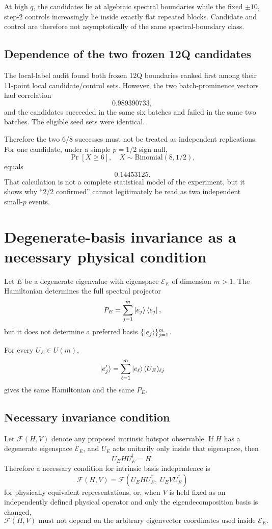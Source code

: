 \documentclass[11pt,a4paper]{article}
\begin{document}
At high \(q\), the candidates lie at algebraic spectral boundaries while the
fixed \(\pm10\), step-2 controls increasingly lie inside exactly flat repeated
blocks.  Candidate and control are therefore not asymptotically of the same
spectral-boundary class.

\subsection{Dependence of the two frozen 12Q candidates}

The local-label audit found both frozen 12Q boundaries ranked first among their
11-point local candidate/control sets.  However, the two batch-prominence
vectors had correlation
\[
0.989390733,
\]
and the candidates succeeded in the same six batches and failed in the same
two batches.  The eligible seed sets were identical.

Therefore the two \(6/8\) successes must not be treated as independent
replications.  For one candidate, under a simple \(p=1/2\) sign null,
\[
\Pr[X\ge6],\quad X\sim\mathrm{Binomial}(8,1/2),
\]
equals
\[
0.14453125.
\]
That calculation is not a complete statistical model of the experiment, but
it shows why ``2/2 confirmed'' cannot legitimately be read as two independent
small-\(p\) events.

\section{Degenerate-basis invariance as a necessary physical condition}

Let \(E\) be a degenerate eigenvalue with eigenspace
\(\mathcal E_E\) of dimension \(m>1\).  The Hamiltonian determines the full
spectral projector
\[
P_E
=
\sum_{j=1}^{m}\ket{e_j}\bra{e_j},
\]
but it does not determine a preferred basis
\(\{\ket{e_j}\}_{j=1}^m\).

For every \(U_E\in U(m)\),
\[
\ket{e_j'}
=
\sum_{\ell=1}^m
\ket{e_\ell}(U_E)_{\ell j}
\]
gives the same Hamiltonian and the same \(P_E\).


\subsection{Necessary invariance condition}

Let \(\mathcal F(H,V)\) denote any proposed intrinsic hotspot observable.
If \(H\) has a degenerate eigenspace \(\mathcal E_E\), and \(U_E\) acts
unitarily only inside that eigenspace, then
\[
U_EHU_E^\dagger=H.
\]
Therefore a necessary condition for intrinsic basis independence is
\[
\boxed{
\mathcal F(H,V)
=
\mathcal F(U_EHU_E^\dagger,\;U_EV U_E^\dagger)
}
\]
for physically equivalent representations, or, when \(V\) is held fixed as an
independently defined physical operator and only the eigendecomposition basis
is changed,
\[
\boxed{
\mathcal F(H,V)
\text{ must not depend on the arbitrary eigenvector coordinates used inside }
\mathcal E_E.
}
\]
\end{document}
